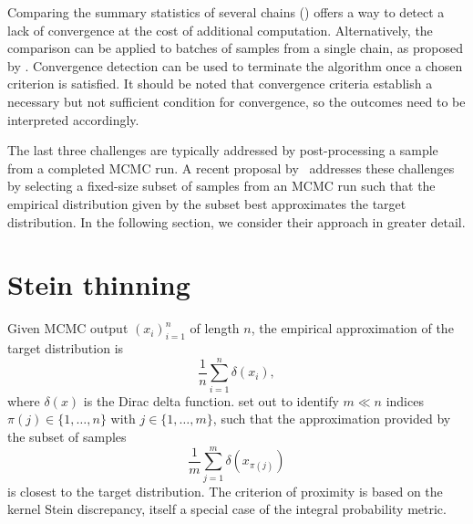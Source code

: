 \documentclass[11pt,a4paper]{report}
\begin{document}
Comparing the summary statistics of several chains (\cite{gelmanInferenceIterativeSimulation1992,brooksGeneralMethodsMonitoring1998,vehtariRankNormalizationFoldingLocalization2021}) offers a way to detect a lack of convergence at the cost of additional computation. Alternatively, the comparison can be applied to batches of samples from a single chain, as proposed by \cite{vatsRevisitingGelmanRubin2021}. Convergence detection can be used to terminate the algorithm once a chosen criterion is satisfied. It should be noted that convergence criteria establish a necessary but not sufficient condition for convergence, so the outcomes need to be interpreted accordingly.

The last three challenges are typically addressed by post-processing a sample from a completed MCMC run. A recent proposal by~\cite{riabizOptimalThinningMCMC2022} addresses these challenges by selecting a fixed-size subset of samples from an MCMC run such that the empirical distribution given by the subset best approximates the target distribution. In the following section, we consider their approach in greater detail.

\section{Stein thinning}
\label{sec:stein-thinning}

Given MCMC output $(x_i)_{i=1}^n$ of length $n$, the empirical approximation of the target distribution is
\begin{equation}
\frac{1}{n} \sum_{i=1}^n \delta(x_i),
\label{eq:discrete-distribution}
\end{equation}
where $\delta(x)$ is the Dirac delta function.
\cite{riabizOptimalThinningMCMC2022} set out to identify $m \ll n$ indices $\pi(j) \in \{1,\dots, n\}$ with $j\in\{1, \dots, m\}$, such that the approximation provided by the subset of samples
\begin{equation}
\frac{1}{m} \sum_{j=1}^m \delta(x_{\pi(j)})
\label{eq:thinned-sample}
\end{equation}
is closest to the target distribution. The criterion of proximity is based on the kernel Stein discrepancy, itself a special case of the integral probability metric.
\end{document}
